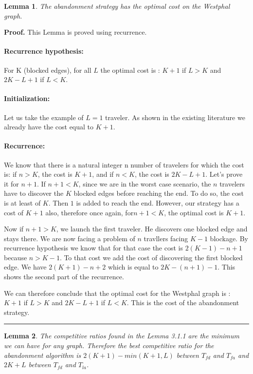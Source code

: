 \documentclass[letter-size, 11pt]{article}
\newtheorem{lemma}{Lemma}
\newenvironment{proof}[1][Proof]{\textbf{#1.} }{\ \rule{0.5em}{0.5em}}
\begin{document}
\begin{lemma} The abandonment strategy has the optimal cost on the Westphal graph.
\end{lemma}

\begin{proof} This Lemma is proved using recurrence.  

\paragraph{Recurrence hypothesis:} For K (blocked edges), for all $L$ the optimal cost is : $K + 1$ if $L > K$ and $2K - L + 1$ if $L < K$.

\paragraph{Initialization:} Let us take the example of $L = 1$ traveler. As shown in the existing literature we already have the cost equal to $K + 1$.

\paragraph{Recurrence:} We know that there is a natural integer n number of travelers for which the cost is: if $n > K$, the cost is $K + 1$, and if $n < K$, the cost is $2K - L + 1$. Let's prove it for $n + 1$. 
If $n + 1 < K$, since we are in the worst case scenario, the $n$ travelers have to discover the $K$ blocked edges before reaching the end. To do so, the cost is at least of $K$. Then $1$ is added to reach the end. However, our strategy has a cost of $K + 1$ also, therefore once again, for$ n + 1 < K$, the optimal cost is $K + 1$. 

Now if $n + 1 > K$, we launch the first traveler. He discovers one blocked edge and stays there. We are now facing a problem of $n$ travllers facing $K-1$ blockage. By recurrence hypothesis we know that for that case the cost is $2(K-1) - n + 1$ because $n > K - 1$. To that cost we add the cost of discovering the first blocked edge. We have $2(K + 1) - n + 2$ which is equal to $2K - (n + 1) - 1$. This shows the second part of the recurrence.

We can therefore conclude that the optimal cost for the Westphal graph is : $K + 1$ if $L > K$ and $2K - L + 1$ if $L < K$. This is the cost of the abandonment strategy. 
\end{proof}

\begin{lemma} The competitive ratios found in the Lemma 3.1.1 are the minimum we can have for any graph. Therefore the best competitive ratio for the abandonment algorithm is $2(K+1) - min(K+1,L)$ between $T_{fd}$ and $T_{fa}$ and $2K+L$ between $T_{fd}$ and $T_{la}$.
\end{lemma}
\end{document}
